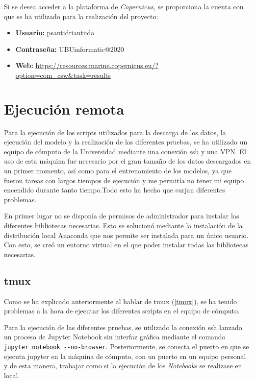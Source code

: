 Si se desea acceder a la plataforma de \emph{Copernicus}, se proporciona la cuenta con que se ha utilizado para la realización del proyecto:
\begin{itemize}
	\item \textbf{Usuario:} psantidriantuda
	\item \textbf{Contraseña:} UBUinformatic@2020
	\item \textbf{Web:}
	\url{https://resources.marine.copernicus.eu/?option=com_csw&task=results}
\end{itemize}

\section{Ejecución remota}
Para la ejecución de los scripts utilizados para la descarga de los datos, la ejecución del modelo y la realización de las diferentes pruebas, se ha utilizado un equipo de cómputo de la Universidad mediante una conexión ssh y una VPN. El uso de esta máquina fue necesario por el gran tamaño de los datos descargados en un primer momento, así como para el entrenamiento de los modelos, ya que fueron tareas con largos tiempos de ejecución y me permitía no tener mi equipo encendido durante tanto tiempo.Todo esto ha hecho que surjan diferentes problemas.

En primer lugar no se disponía de permisos de administrador para instalar las diferentes bibliotecas necesarias. Esto se solucionó mediante la instalación de la distribución local Anaconda que nos permite ser instalada para un único usuario. Con esto, se creó un entorno virtual en el que poder instalar todas las bibliotecas necesarias.

\subsection{tmux}
Como se ha explicado anteriormente al hablar de tmux (\ref{tmux}), se ha tenido problemas a la hora de ejecutar los diferentes scripts en el equipo de cómputo.

Para la ejecución de las diferentes pruebas, se utilizado la conexión ssh lanzado un proceso de Jupyter Notebook sin interfaz gráfica mediante el comando \verb|jupyter notebook --no-browser|. Posteriormente, se conecta el puerto en que se ejecuta jupyter en la máquina de cómputo, con un puerto en un equipo personal y de esta manera, trabajar como si la ejecución de los \emph{Notebooks} se realizase en local.

